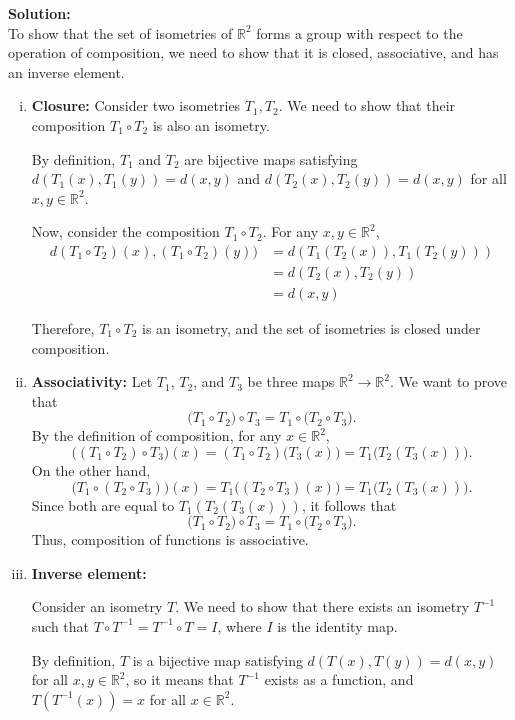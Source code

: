 \documentclass{article}
\begin{document}
\textbf{Solution:}\\

To show that the set of isometries of $\mathbb{R}^2$ forms a group with respect to the operation of composition, we need to show that it is closed, associative, and has an inverse element.

\begin{enumerate}[(i)]
\item \textbf{Closure:}
Consider two isometries $T_1, T_2$. We need to show that their composition $T_1 \circ T_2$ is also an isometry.

By definition, $T_1$ and $T_2$ are bijective maps satisfying $d(T_1(x), T_1(y)) = d(x,y)$ and $d(T_2(x), T_2(y)) = d(x,y)$ for all $x,y \in \mathbb{R}^2$.

Now, consider the composition $T_1 \circ T_2$. For any $x,y \in \mathbb{R}^2$,
\begin{align*}
d(T_1 \circ T_2)(x), (T_1 \circ T_2)(y)) &= d(T_1(T_2(x)), T_1(T_2(y))) \\
&= d(T_2(x), T_2(y)) \\
&= d(x,y)
\end{align*}

Therefore, $T_1 \circ T_2$ is an isometry, and the set of isometries is closed under composition.

\item \textbf{Associativity:}
Let \(T_1\), \(T_2\), and \(T_3\) be three maps \(\mathbb{R}^2 \to \mathbb{R}^2\). We want to prove that
\[
\bigl(T_1 \circ T_2 \bigr) \circ T_3
= T_1 \circ \bigl(T_2 \circ T_3\bigr).
\]
By the definition of composition, for any \(x \in \mathbb{R}^2\),
\[
\bigl((T_1 \circ T_2) \circ T_3 \bigr)(x)
= (T_1 \circ T_2)\bigl(T_3(x)\bigr)
= T_1\bigl(T_2(T_3(x))\bigr).
\]
On the other hand,
\[
\bigl(T_1 \circ (T_2 \circ T_3)\bigr)(x)
= T_1\bigl( (T_2 \circ T_3)(x) \bigr)
= T_1\bigl(T_2(T_3(x))\bigr).
\]
Since both are equal to \(T_1(T_2(T_3(x)))\), it follows that
\[
\bigl(T_1 \circ T_2 \bigr) \circ T_3 = T_1 \circ \bigl(T_2 \circ T_3\bigr).
\]
Thus, composition of functions is associative.

\item \textbf{Inverse element:}

Consider an isometry $T$. We need to show that there exists an isometry $T^{-1}$ such that $T \circ T^{-1} = T^{-1} \circ T = I$, where $I$ is the identity map.

By definition, $T$ is a bijective map satisfying $d(T(x), T(y)) = d(x,y)$ for all $x,y \in \mathbb{R}^2$, so it means that $T^{-1}$ exists as a function, and $T(T^{-1}(x)) = x$ for all $x \in \mathbb{R}^2$.


\end{enumerate}
\end{document}
